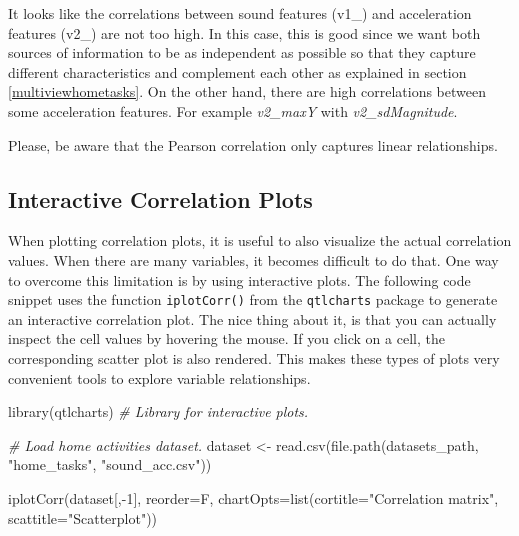 \documentclass[
  11pt,
]{krantz}
\makeatletter
\newenvironment{Shaded}{\begin{snugshade}}{\end{snugshade}}
\newcommand{\AttributeTok}[1]{\textcolor[rgb]{0.61,0.61,0.61}{#1}}
\newcommand{\CommentTok}[1]{\textcolor[rgb]{0.37,0.37,0.37}{\textit{#1}}}
\newcommand{\DecValTok}[1]{\textcolor[rgb]{0.06,0.06,0.06}{#1}}
\newcommand{\FunctionTok}[1]{\textcolor[rgb]{0,0,0}{#1}}
\newcommand{\NormalTok}[1]{#1}
\newcommand{\OtherTok}[1]{\textcolor[rgb]{0.37,0.37,0.37}{#1}}
\newcommand{\SpecialCharTok}[1]{\textcolor[rgb]{0,0,0}{#1}}
\newcommand{\StringTok}[1]{\textcolor[rgb]{0.5,0.5,0.5}{#1}}
\newenvironment{kframe}{%
\medskip{}
\setlength{\fboxsep}{.8em}
 \def\at@end@of@kframe{}%
 \ifinner\ifhmode%
  \def\at@end@of@kframe{\end{minipage}}%
  \begin{minipage}{\columnwidth}%
 \fi\fi%
 \def\FrameCommand##1{\hskip\@totalleftmargin \hskip-\fboxsep
 \colorbox{shadecolor}{##1}\hskip-\fboxsep
     \hskip-\linewidth \hskip-\@totalleftmargin \hskip\columnwidth}%
 \MakeFramed {\advance\hsize-\width
   \@totalleftmargin\z@ \linewidth\hsize
   \@setminipage}}%
 {\par\unskip\endMakeFramed%
 \at@end@of@kframe}
\newenvironment{rmdblock}[1]
  {
  \begin{itemize}
  \renewcommand{\labelitemi}{
    \raisebox{-.7\height}[0pt][0pt]{
      {\setkeys{Gin}{width=3em,keepaspectratio}\texttt{[image: images/icons/\#1]}}
    }
  }
  \setlength{\fboxsep}{1em}
  \begin{kframe}
  \item
  }
  {
  \end{kframe}
  \end{itemize}
  }
\newenvironment{rmdcaution}
  {\begin{rmdblock}{caution}}
  {\end{rmdblock}}
\makeatother
\begin{document}
It looks like the correlations between sound features (v1\_) and acceleration features (v2\_) are not too high. In this case, this is good since we want both sources of information to be as independent as possible so that they capture different characteristics and complement each other as explained in section \ref{multiviewhometasks}. On the other hand, there are high correlations between some acceleration features. For example \emph{v2\_maxY} with \emph{v2\_sdMagnitude}.

\begin{rmdcaution}
Please, be aware that the Pearson correlation only captures linear relationships.
\end{rmdcaution}

\hypertarget{interactive-correlation-plots}{%
\subsection{Interactive Correlation Plots}\label{interactive-correlation-plots}}

When plotting correlation plots, it is useful to also visualize the actual correlation values. When there are many variables, it becomes difficult to do that. One way to overcome this limitation is by using interactive plots. The following code snippet uses the function \texttt{iplotCorr()} from the \texttt{qtlcharts} package to generate an interactive correlation plot. The nice thing about it, is that you can actually inspect the cell values by hovering the mouse. If you click on a cell, the corresponding scatter plot is also rendered. This makes these types of plots very convenient tools to explore variable relationships.

\begin{Shaded}
\begin{Highlighting}[]
\FunctionTok{library}\NormalTok{(qtlcharts) }\CommentTok{\# Library for interactive plots.}

\CommentTok{\# Load home activities dataset.}
\NormalTok{dataset }\OtherTok{\textless{}{-}} \FunctionTok{read.csv}\NormalTok{(}\FunctionTok{file.path}\NormalTok{(datasets\_path,}
                              \StringTok{"home\_tasks"}\NormalTok{,}
                              \StringTok{"sound\_acc.csv"}\NormalTok{))}

\FunctionTok{iplotCorr}\NormalTok{(dataset[,}\SpecialCharTok{{-}}\DecValTok{1}\NormalTok{], }\AttributeTok{reorder=}\NormalTok{F,}
          \AttributeTok{chartOpts=}\FunctionTok{list}\NormalTok{(}\AttributeTok{cortitle=}\StringTok{"Correlation matrix"}\NormalTok{,}
                         \AttributeTok{scattitle=}\StringTok{"Scatterplot"}\NormalTok{))}
\end{Highlighting}
\end{Shaded}
\end{document}
